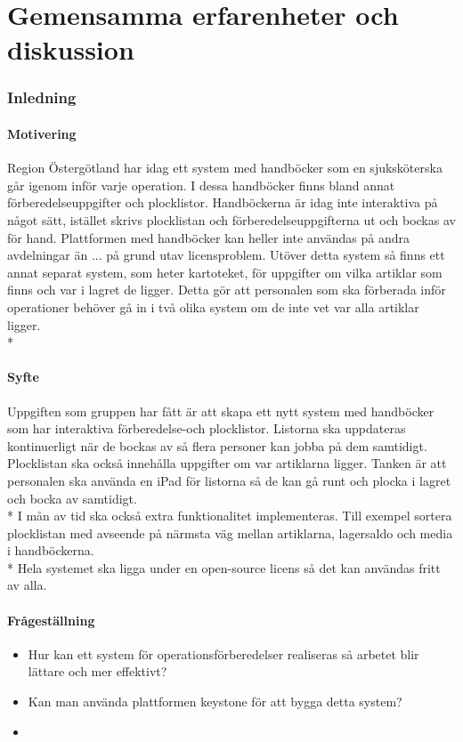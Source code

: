 \documentclass{article}
\begin{document}
\tableofcontents
\part{Gemensamma erfarenheter och diskussion}

\section{Inledning}
\subsection{Motivering}
Region Östergötland har idag ett system med handböcker som en sjuksköterska går igenom inför varje operation. I dessa handböcker finns bland annat förberedelseuppgifter och plocklistor. Handböckerna är idag inte interaktiva på något sätt, istället skrivs plocklistan och förberedelseuppgifterna ut och bockas av för hand. Plattformen med handböcker kan heller inte användas på andra avdelningar än ... på grund utav licensproblem. Utöver detta system så finns ett annat separat system, som heter kartoteket, för uppgifter om vilka artiklar som finns och var i lagret de ligger. Detta gör att personalen som ska förberada inför operationer behöver gå in i två olika system om de inte vet var alla artiklar ligger.\\*

\subsection{Syfte}
Uppgiften som gruppen har fått är att skapa ett nytt system med handböcker som har interaktiva förberedelse-och plocklistor. Listorna ska uppdateras kontinuerligt när de bockas av så flera personer kan jobba på dem samtidigt. Plocklistan ska också innehålla uppgifter om var artiklarna ligger. Tanken är att personalen ska använda en iPad för listorna så de kan gå runt och plocka i lagret och bocka av samtidigt. \\*
I mån av tid ska också extra funktionalitet implementeras. Till exempel sortera plocklistan med avseende på närmsta väg mellan artiklarna, lagersaldo och media i handböckerna. \\*
Hela systemet ska ligga under en open-source licens så det kan användas fritt av alla.    
\subsection{Frågeställning}
\begin{itemize}
\item Hur kan ett system för operationsförberedelser realiseras så arbetet blir lättare och mer effektivt?
\item Kan man använda plattformen keystone för att bygga detta system?
\item 
\end{itemize}
\end{document}

